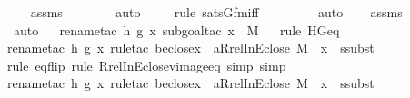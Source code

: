 \begin{isabellebody}
\ \ \isamarkupfalse%
\ assms\isanewline
\ \ \ \ \ \ \isamarkupfalse%
\ auto{\isacharbrackleft}{\kern0pt}{}{\isacharbrackright}{\kern0pt}\isanewline
\ \ \ \ \isamarkupfalse%
{\isacharparenleft}{\kern0pt}rule\ sats{\isacharunderscore}{\kern0pt}Gfm{\isacharunderscore}{\kern0pt}iff{\isacharparenright}{\kern0pt}\isanewline
\ \ \ \ \ \ \ \isamarkupfalse%
\ auto{\isacharbrackleft}{\kern0pt}{}{\isacharbrackright}{\kern0pt}\isanewline
\ \ \isamarkupfalse%
\ assms\ \isanewline
\ \ \ \isamarkupfalse%
\ auto{\isacharbrackleft}{\kern0pt}{}{\isacharbrackright}{\kern0pt}\isanewline
\ \ \isamarkupfalse%
{\isacharparenleft}{\kern0pt}rename{\isacharunderscore}{\kern0pt}tac\ h\ g\ x{\isacharcomma}{\kern0pt}\ subgoal{\isacharunderscore}{\kern0pt}tac\ {\isachardoublequoteopen}x\ {\isasymin}\ M{\isachardoublequoteclose}{\isacharparenright}{\kern0pt}\isanewline
\ \ \isamarkupfalse%
{\isacharparenleft}{\kern0pt}rule\ HGeq{\isacharparenright}{\kern0pt}\isanewline
\ \ \ \ \ \ \ \isamarkupfalse%
{\isacharparenleft}{\kern0pt}rename{\isacharunderscore}{\kern0pt}tac\ h\ g\ x{\isacharcomma}{\kern0pt}\ rule{\isacharunderscore}{\kern0pt}tac\ b{\isacharequal}{\kern0pt}{\isachardoublequoteopen}eclose{\isacharparenleft}{\kern0pt}x{\isacharparenright}{\kern0pt}{\isachardoublequoteclose}\ \ a{\isacharequal}{\kern0pt}{\isachardoublequoteopen}Rrel{\isacharparenleft}{\kern0pt}InEclose{\isacharcomma}{\kern0pt}\ M{\isacharparenright}{\kern0pt}\ {\isacharminus}{\kern0pt}{\isacharbackquote}{\kern0pt}{\isacharbackquote}{\kern0pt}\ {\isacharbraceleft}{\kern0pt}x{\isacharbraceright}{\kern0pt}{\isachardoublequoteclose}\ \ ssubst{\isacharparenright}{\kern0pt}\isanewline
\ \ \ \ \ \ \isamarkupfalse%
{\isacharparenleft}{\kern0pt}rule\ eq{\isacharunderscore}{\kern0pt}flip{\isacharcomma}{\kern0pt}\ rule\ Rrel{\isacharunderscore}{\kern0pt}InEclose{\isacharunderscore}{\kern0pt}vimage{\isacharunderscore}{\kern0pt}eq{\isacharcomma}{\kern0pt}\ simp{\isacharcomma}{\kern0pt}\ simp{\isacharparenright}{\kern0pt}\isanewline
\ \ \ \ \ \ \isamarkupfalse%
{\isacharparenleft}{\kern0pt}rename{\isacharunderscore}{\kern0pt}tac\ h\ g\ x{\isacharcomma}{\kern0pt}\ rule{\isacharunderscore}{\kern0pt}tac\ b{\isacharequal}{\kern0pt}{\isachardoublequoteopen}eclose{\isacharparenleft}{\kern0pt}x{\isacharparenright}{\kern0pt}{\isachardoublequoteclose}\ \ a{\isacharequal}{\kern0pt}{\isachardoublequoteopen}Rrel{\isacharparenleft}{\kern0pt}InEclose{\isacharcomma}{\kern0pt}\ M{\isacharparenright}{\kern0pt}\ {\isacharminus}{\kern0pt}{\isacharbackquote}{\kern0pt}{\isacharbackquote}{\kern0pt}\ {\isacharbraceleft}{\kern0pt}x{\isacharbraceright}{\kern0pt}{\isachardoublequoteclose}\ \ ssubst{\isacharparenright}{\kern0pt}\isanewline

\end{isabellebody}
